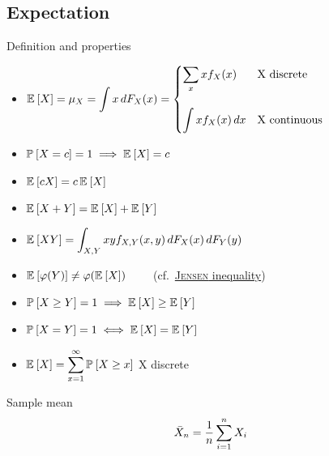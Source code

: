 \documentclass[landscape]{article}
\begin{document}
\begin{multicols*}{2}

\section{Expectation}

Definition and properties
\begin{itemize}
  \item $\E{X} = \mu_X = \displaystyle \int x \dfx =
    \begin{cases}
      \displaystyle\sum_x xf_X(x) & \text{X discrete} \\\\
      \displaystyle\int xf_X(x)\dx & \text{X continuous}
    \end{cases}$
  \item $\Pr{X=c}=1 \imp \E{X} = c$
  \item $\E{cX} = c\,\E{X}$
  \item $\E{X+Y} = \E{X}+\E{Y}$
  \item $\E{XY} = \displaystyle\int_{X,Y} xy f_{X,Y}(x,y)\dfx\dfy$
  \item $\E{\transform(Y)} \neq \transform(\E{X}) \qquad$
    (cf.~\hyperref[jensen]{\textsc{Jensen} inequality})
  \item $\Pr{X \ge Y} = 1 \imp \E{X}\ge\E{Y}$
  \item $\Pr{X=Y} = 1 \eqv \E{X}=\E{Y}$
  \item $\E{X} = \displaystyle\sum_{x=1}^\infty \Pr{X\ge x}$ \qquad X discrete
\end{itemize}

Sample mean
\[\samplemean = \frac{1}{n}\sum_{i=1}^n X_i\]


\end{multicols*}
\end{document}
